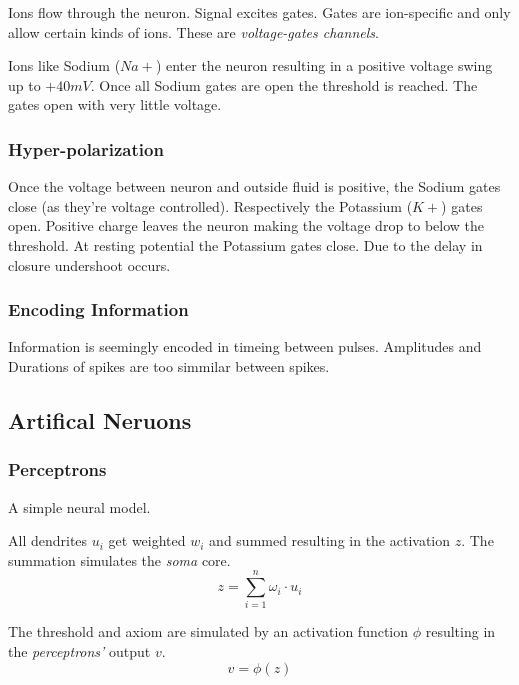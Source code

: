 \documentclass[
    fontsize      = 11pt,
    paper         = a4,
    twoside       = false,
    parskip       = half,
    pagesize      = false,
]{scrartcl}
\begin{document}
Ions flow through the neuron. Signal excites gates. Gates are
ion-specific and only allow certain kinds of ions. These are
\emph{voltage-gates channels}.

Ions like Sodium (\(\mathit{Na}+\)) enter the neuron resulting in a
positive voltage swing up to \(+40\si{mV}\). Once all Sodium gates are
open the threshold is reached. The gates open with very little voltage.

\hypertarget{hyper-polarization}{%
\subsubsection{Hyper-polarization}\label{hyper-polarization}}

Once the voltage between neuron and outside fluid is positive, the
Sodium gates close (as they're voltage controlled). Respectively the
Potassium (\(\mathit{K}+\)) gates open. Positive charge leaves the
neuron making the voltage drop to below the threshold. At resting
potential the Potassium gates close. Due to the delay in closure
undershoot occurs.

\hypertarget{encoding-information}{%
\subsubsection{Encoding Information}\label{encoding-information}}

Information is seemingly encoded in timeing between pulses. Amplitudes
and Durations of spikes are too simmilar between spikes.

\hypertarget{artifical-neruons}{%
\subsection{Artifical Neruons}\label{artifical-neruons}}

\hypertarget{perceptrons}{%
\subsubsection{Perceptrons}\label{perceptrons}}

A simple neural model.

All dendrites \(u_i\) get weighted \(w_i\) and summed resulting in the
activation \(z\). The summation simulates the \emph{soma} core.
\[z = \sum_{i=1}^{n} \omega_i \cdot u_i\]

The threshold and axiom are simulated by an activation function \(\phi\)
resulting in the \emph{perceptrons'} output \(v\). \[v = \phi(z)\]
\end{document}
